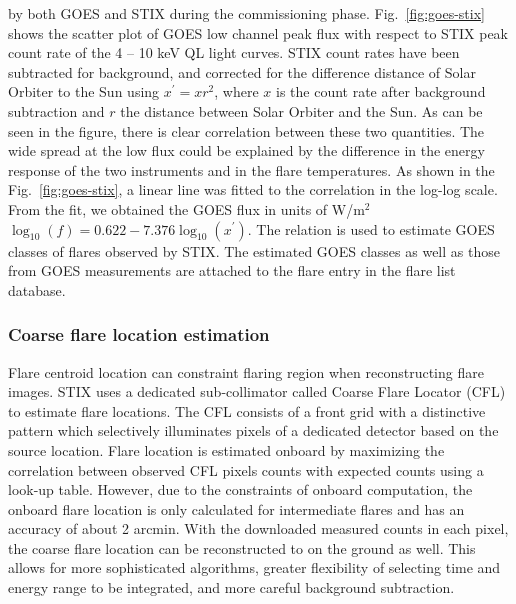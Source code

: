 \documentclass[referee]{aa} %
\begin{document}
by both GOES  and   STIX during the commissioning phase.   
Fig.~\ref{fig:goes-stix} shows the scatter plot of GOES low channel peak flux with respect to 
STIX peak count rate  of the 4 -- 10 keV QL light curves. 
STIX count rates  have been subtracted for background,  and corrected for 
the difference distance of Solar Orbiter to the Sun using $x^{'}=x r^2$, where $x$ is the count rate after background subtraction
 and $r$ the distance between Solar Orbiter and the Sun. 
As can be seen in the figure, there is clear correlation between
these two quantities.  The wide spread at the low flux could be explained by the difference in 
the energy response of the two instruments and in the flare temperatures. 
As shown in the Fig.~\ref{fig:goes-stix}, a linear line
was fitted to the  correlation in the log-log scale. 
From the fit, we obtained 
the GOES flux in units of W/m$^2$ $\log_{10}(f) = 0.622 -7.376 \log_{10} (x^{'})$.
The relation is used to estimate  GOES classes  of flares observed by STIX. 
The estimated GOES classes as well as those from GOES measurements 
are attached to  the flare entry in the flare list database. 

\subsubsection{Coarse flare location estimation}
Flare centroid location can constraint flaring region when reconstructing flare images.
STIX uses a dedicated sub-collimator called Coarse Flare Locator (CFL) to estimate flare locations.
The CFL consists of a front grid with
a distinctive pattern which selectively illuminates pixels of a 
dedicated detector based on the source location.
Flare location is estimated onboard by maximizing the correlation between observed CFL pixels counts 
with expected counts using a look-up table. 
However, due to the constraints of onboard computation, the onboard flare location is  only calculated for intermediate flares 
and has an accuracy of about 2 arcmin. 
With the downloaded measured counts  in each pixel,
the coarse flare location can be reconstructed to on the ground as well. 
This allows for more sophisticated algorithms, greater flexibility of selecting time and energy 
range to be integrated, and more careful background subtraction.
\end{document}
